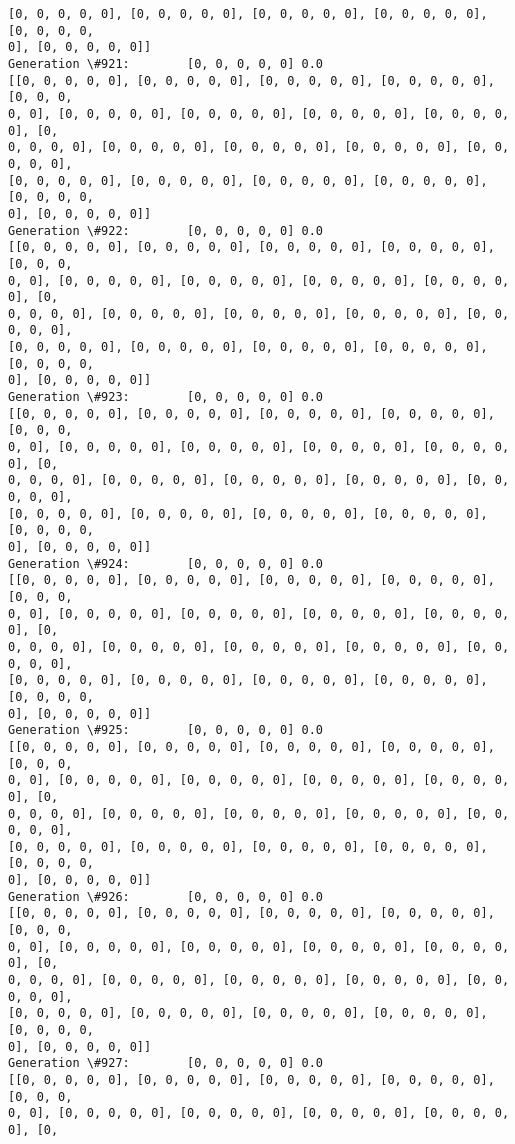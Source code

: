 \documentclass[11pt]{article}
\begin{document}
\begin{Verbatim}[commandchars=\\\{\}]
[0, 0, 0, 0, 0], [0, 0, 0, 0, 0], [0, 0, 0, 0, 0], [0, 0, 0, 0, 0], [0, 0, 0, 0,
0], [0, 0, 0, 0, 0]]
Generation \#921:        [0, 0, 0, 0, 0] 0.0
[[0, 0, 0, 0, 0], [0, 0, 0, 0, 0], [0, 0, 0, 0, 0], [0, 0, 0, 0, 0], [0, 0, 0,
0, 0], [0, 0, 0, 0, 0], [0, 0, 0, 0, 0], [0, 0, 0, 0, 0], [0, 0, 0, 0, 0], [0,
0, 0, 0, 0], [0, 0, 0, 0, 0], [0, 0, 0, 0, 0], [0, 0, 0, 0, 0], [0, 0, 0, 0, 0],
[0, 0, 0, 0, 0], [0, 0, 0, 0, 0], [0, 0, 0, 0, 0], [0, 0, 0, 0, 0], [0, 0, 0, 0,
0], [0, 0, 0, 0, 0]]
Generation \#922:        [0, 0, 0, 0, 0] 0.0
[[0, 0, 0, 0, 0], [0, 0, 0, 0, 0], [0, 0, 0, 0, 0], [0, 0, 0, 0, 0], [0, 0, 0,
0, 0], [0, 0, 0, 0, 0], [0, 0, 0, 0, 0], [0, 0, 0, 0, 0], [0, 0, 0, 0, 0], [0,
0, 0, 0, 0], [0, 0, 0, 0, 0], [0, 0, 0, 0, 0], [0, 0, 0, 0, 0], [0, 0, 0, 0, 0],
[0, 0, 0, 0, 0], [0, 0, 0, 0, 0], [0, 0, 0, 0, 0], [0, 0, 0, 0, 0], [0, 0, 0, 0,
0], [0, 0, 0, 0, 0]]
Generation \#923:        [0, 0, 0, 0, 0] 0.0
[[0, 0, 0, 0, 0], [0, 0, 0, 0, 0], [0, 0, 0, 0, 0], [0, 0, 0, 0, 0], [0, 0, 0,
0, 0], [0, 0, 0, 0, 0], [0, 0, 0, 0, 0], [0, 0, 0, 0, 0], [0, 0, 0, 0, 0], [0,
0, 0, 0, 0], [0, 0, 0, 0, 0], [0, 0, 0, 0, 0], [0, 0, 0, 0, 0], [0, 0, 0, 0, 0],
[0, 0, 0, 0, 0], [0, 0, 0, 0, 0], [0, 0, 0, 0, 0], [0, 0, 0, 0, 0], [0, 0, 0, 0,
0], [0, 0, 0, 0, 0]]
Generation \#924:        [0, 0, 0, 0, 0] 0.0
[[0, 0, 0, 0, 0], [0, 0, 0, 0, 0], [0, 0, 0, 0, 0], [0, 0, 0, 0, 0], [0, 0, 0,
0, 0], [0, 0, 0, 0, 0], [0, 0, 0, 0, 0], [0, 0, 0, 0, 0], [0, 0, 0, 0, 0], [0,
0, 0, 0, 0], [0, 0, 0, 0, 0], [0, 0, 0, 0, 0], [0, 0, 0, 0, 0], [0, 0, 0, 0, 0],
[0, 0, 0, 0, 0], [0, 0, 0, 0, 0], [0, 0, 0, 0, 0], [0, 0, 0, 0, 0], [0, 0, 0, 0,
0], [0, 0, 0, 0, 0]]
Generation \#925:        [0, 0, 0, 0, 0] 0.0
[[0, 0, 0, 0, 0], [0, 0, 0, 0, 0], [0, 0, 0, 0, 0], [0, 0, 0, 0, 0], [0, 0, 0,
0, 0], [0, 0, 0, 0, 0], [0, 0, 0, 0, 0], [0, 0, 0, 0, 0], [0, 0, 0, 0, 0], [0,
0, 0, 0, 0], [0, 0, 0, 0, 0], [0, 0, 0, 0, 0], [0, 0, 0, 0, 0], [0, 0, 0, 0, 0],
[0, 0, 0, 0, 0], [0, 0, 0, 0, 0], [0, 0, 0, 0, 0], [0, 0, 0, 0, 0], [0, 0, 0, 0,
0], [0, 0, 0, 0, 0]]
Generation \#926:        [0, 0, 0, 0, 0] 0.0
[[0, 0, 0, 0, 0], [0, 0, 0, 0, 0], [0, 0, 0, 0, 0], [0, 0, 0, 0, 0], [0, 0, 0,
0, 0], [0, 0, 0, 0, 0], [0, 0, 0, 0, 0], [0, 0, 0, 0, 0], [0, 0, 0, 0, 0], [0,
0, 0, 0, 0], [0, 0, 0, 0, 0], [0, 0, 0, 0, 0], [0, 0, 0, 0, 0], [0, 0, 0, 0, 0],
[0, 0, 0, 0, 0], [0, 0, 0, 0, 0], [0, 0, 0, 0, 0], [0, 0, 0, 0, 0], [0, 0, 0, 0,
0], [0, 0, 0, 0, 0]]
Generation \#927:        [0, 0, 0, 0, 0] 0.0
[[0, 0, 0, 0, 0], [0, 0, 0, 0, 0], [0, 0, 0, 0, 0], [0, 0, 0, 0, 0], [0, 0, 0,
0, 0], [0, 0, 0, 0, 0], [0, 0, 0, 0, 0], [0, 0, 0, 0, 0], [0, 0, 0, 0, 0], [0,

\end{Verbatim}
\end{document}
